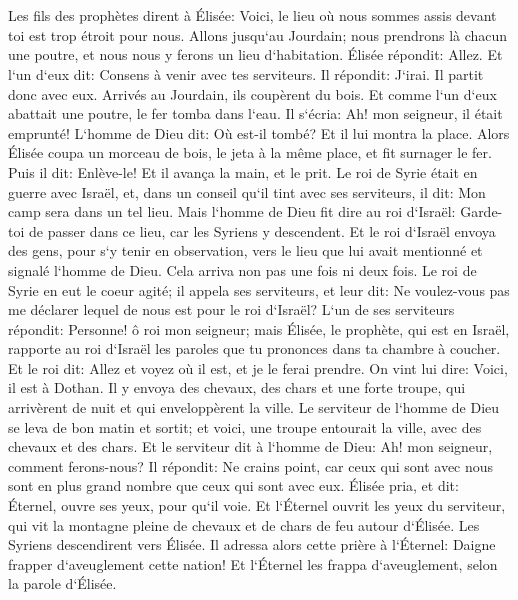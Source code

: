 \chapter{}

\verse Les fils des prophètes dirent à Élisée: Voici, le lieu où nous sommes assis devant toi est trop étroit pour nous. 
\verse Allons jusqu`au Jourdain; nous prendrons là chacun une poutre, et nous nous y ferons un lieu d`habitation. Élisée répondit: Allez. 
\verse Et l`un d`eux dit: Consens à venir avec tes serviteurs. Il répondit: J`irai. 
\verse Il partit donc avec eux. Arrivés au Jourdain, ils coupèrent du bois. 
\verse Et comme l`un d`eux abattait une poutre, le fer tomba dans l`eau. Il s`écria: Ah! mon seigneur, il était emprunté! 
\verse L`homme de Dieu dit: Où est-il tombé? Et il lui montra la place. Alors Élisée coupa un morceau de bois, le jeta à la même place, et fit surnager le fer. 
\verse Puis il dit: Enlève-le! Et il avança la main, et le prit. 
\verse Le roi de Syrie était en guerre avec Israël, et, dans un conseil qu`il tint avec ses serviteurs, il dit: Mon camp sera dans un tel lieu. 
\verse Mais l`homme de Dieu fit dire au roi d`Israël: Garde-toi de passer dans ce lieu, car les Syriens y descendent. 
\verse Et le roi d`Israël envoya des gens, pour s`y tenir en observation, vers le lieu que lui avait mentionné et signalé l`homme de Dieu. Cela arriva non pas une fois ni deux fois. 
\verse Le roi de Syrie en eut le coeur agité; il appela ses serviteurs, et leur dit: Ne voulez-vous pas me déclarer lequel de nous est pour le roi d`Israël? 
\verse L`un de ses serviteurs répondit: Personne! ô roi mon seigneur; mais Élisée, le prophète, qui est en Israël, rapporte au roi d`Israël les paroles que tu prononces dans ta chambre à coucher. 
\verse Et le roi dit: Allez et voyez où il est, et je le ferai prendre. On vint lui dire: Voici, il est à Dothan. 
\verse Il y envoya des chevaux, des chars et une forte troupe, qui arrivèrent de nuit et qui enveloppèrent la ville. 
\verse Le serviteur de l`homme de Dieu se leva de bon matin et sortit; et voici, une troupe entourait la ville, avec des chevaux et des chars. Et le serviteur dit à l`homme de Dieu: Ah! mon seigneur, comment ferons-nous? 
\verse Il répondit: Ne crains point, car ceux qui sont avec nous sont en plus grand nombre que ceux qui sont avec eux. 
\verse Élisée pria, et dit: Éternel, ouvre ses yeux, pour qu`il voie. Et l`Éternel ouvrit les yeux du serviteur, qui vit la montagne pleine de chevaux et de chars de feu autour d`Élisée. 
\verse Les Syriens descendirent vers Élisée. Il adressa alors cette prière à l`Éternel: Daigne frapper d`aveuglement cette nation! Et l`Éternel les frappa d`aveuglement, selon la parole d`Élisée. 
